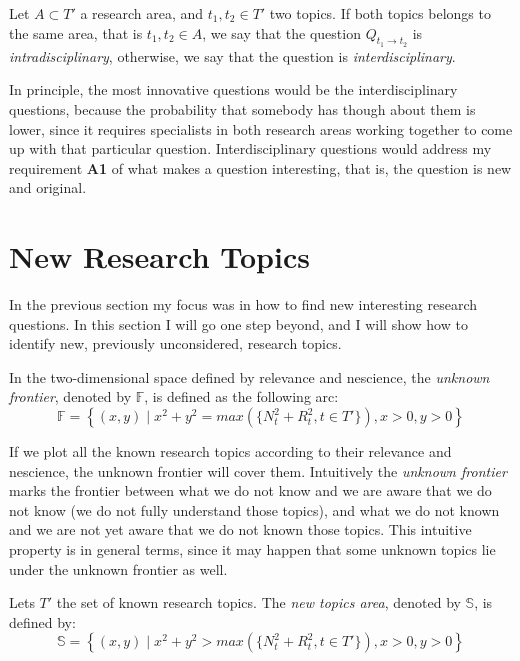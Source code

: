 \begin{definition} 
Let $A \subset T'$ a research area, and $t_{1}, t_{2} \in T'$ two topics. If both topics belongs to the same area, that is $t_{1}, t_{2} \in A$, we say that the question $Q_{t_{1} \rightarrow t_{2}}$ is \emph{intradisciplinary}, otherwise, we say that the question is \emph{interdisciplinary}.
\end{definition}

In principle, the most innovative questions would be the interdisciplinary questions, because the probability that somebody has though about them is lower, since it requires specialists in both research areas working together to come up with that particular question. Interdisciplinary questions would address my requirement \textbf{A1} of what makes a question interesting, that is, the question is new and original.

%
%

\section{New Research Topics}
\label{sec:New_Research_Topics}

In the previous section my focus was in how to find new interesting research questions. In this section I will go one step beyond, and I will show how to identify new, previously unconsidered, research topics.

\begin{definition}
In the two-dimensional space defined by relevance and nescience, the \textit{unknown frontier}, denoted by $\mathbb{F}$, is defined as the following arc:
\[
\mathbb{F} = \left\{(x,y) \mid x^{2}+y^{2}=max(\{N^2_{t} + R^2_{t}, t \in T'\}),x>0,y>0\right\} 
\]
\end{definition}

If we plot all the known research topics according to their relevance and nescience, the unknown frontier will cover them. Intuitively the \emph{unknown frontier} marks the frontier between what we do not know and we are aware that we do not know (we do not fully understand those topics), and what we do not known and we are not yet aware that we do not known those topics. This intuitive property is in general terms, since it may happen that some unknown topics lie under the unknown frontier as well.

\begin{definition}
Lets $T'$ the set of known research topics. The \emph{new topics area}, denoted by $\mathbb{S}$, is defined by:
\[
\mathbb{S} = \left\{(x,y) \mid x^{2}+y^{2}>max(\{N^2_{t} + R^2_{t}, t \in T'\}),x>0,y>0\right\} 
\]
\end{definition}

